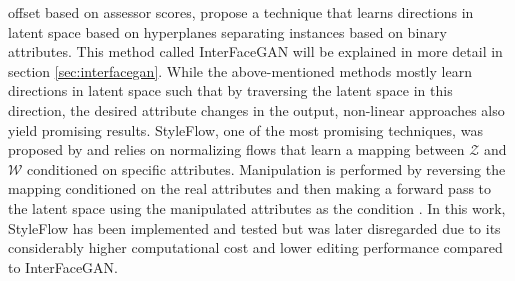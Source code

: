 offset based on assessor scores, \cite{shen2020interpreting} propose a technique that learns directions in latent space based on hyperplanes separating instances based on binary attributes. This method called InterFaceGAN will be explained in more detail in section \ref{sec:interfacegan}. While the above-mentioned methods mostly learn directions in latent space such that by traversing the latent space in this direction, the desired attribute changes in the output, non-linear approaches also yield promising results. StyleFlow, one of the most promising techniques, was proposed by \cite{abdal2021styleflow} and relies on normalizing flows that learn a mapping between $\mathcal{Z}$ and $\mathcal{W}$ conditioned on specific attributes. Manipulation is performed by reversing the mapping conditioned on the real attributes and then making a forward pass to the latent space using the manipulated attributes as the condition \citep[p.5]{abdal2021styleflow}. In this work, StyleFlow has been implemented and tested but was later disregarded due to its considerably higher computational cost and lower editing performance compared to InterFaceGAN. 
